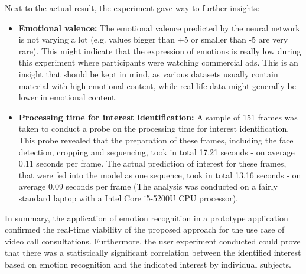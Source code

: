\newline\newline
Next to the actual result, the experiment gave way to further insights:\newline
\begin{itemize}
    \item \textbf{Emotional valence:} The emotional valence predicted by the neural network is not varying a lot (e.g. values bigger than +5 or smaller than -5 are very rare). This might indicate that the expression of emotions is really low during this experiment where participants were watching commercial ads. This is an insight that should be kept in mind, as various datasets usually contain material with high emotional content, while real-life data might generally be lower in emotional content.
    \item \textbf{Processing time for interest identification:} A sample of 151 frames was taken to conduct a probe on the processing time for interest identification. This probe revealed that the preparation of these frames, including the face detection, cropping and sequencing, took in total 17.21 seconds - on average 0.11 seconds per frame. The actual prediction of interest for these frames, that were fed into the model as one sequence, took in total 13.16 seconds - on average 0.09 seconds per frame (The analysis was conducted on a fairly standard laptop with a Intel Core i5-5200U CPU processor).
\end{itemize}

\noindent In summary, the application of emotion recognition in a prototype application confirmed the real-time viability of the proposed approach for the use case of video call consultations. Furthermore, the user experiment conducted could prove that there was a statistically significant correlation between the identified interest based on emotion recognition and the indicated interest by individual subjects.



